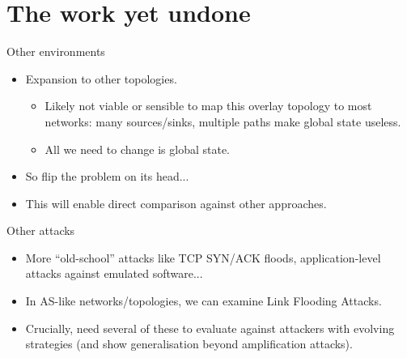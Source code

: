 \documentclass[aspectratio=169,xcolor={dvipsnames}
,hide notes
]{beamer}
\begin{document}
\section{The work yet undone}

\begin{frame}{Other environments}
\begin{itemize}
	\item Expansion to other topologies.
	\begin{itemize}
		\item Likely not viable or sensible to map this overlay topology to most networks: many sources/sinks, multiple paths make global state useless.
		\item All we need to change is global state.
	\end{itemize}
	\item So flip the problem on its head...
	\item This will enable direct comparison against other approaches.
\end{itemize}
\end{frame}

\begin{frame}{Other attacks}
\begin{itemize}
	\item More ``old-school'' attacks like TCP SYN/ACK floods, application-level attacks against emulated software...
	\item In AS-like networks/topologies, we can examine \alert{Link Flooding Attacks}.
	\item Crucially, need several of these to evaluate against attackers with \alert{evolving strategies} (and show generalisation beyond amplification attacks).
\end{itemize}
\end{frame}
\end{document}

